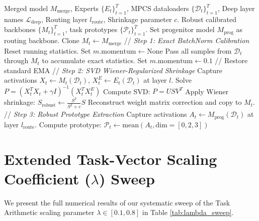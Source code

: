 \documentclass{article}
\theoremstyle{plain}
\theoremstyle{definition}
\theoremstyle{remark}
\begin{document}
\begin{algorithm}[H]
\caption{Robust Empirical Calibration (REC) Pipeline}
\label{alg:rec}
\begin{algorithmic}[1]
 Merged model $M_{\text{merge}}$, Experts $\{E_t\}_{t=1}^T$, MPCS dataloaders $\{\mathcal{D}_t\}_{t=1}^T$, Deep layer names $\mathcal{L}_{\text{deep}}$, Routing layer $l_{\text{route}}$, Shrinkage parameter $c$.
 Robust calibrated backbones $\{M_t\}_{t=1}^T$, task prototypes $\{\mathcal{P}_t\}_{t=1}^T$.
\STATE Set progenitor model $M_{\text{prog}}$ as routing backbone.
    \STATE Clone $M_t \leftarrow M_{\text{merge}}$
    \STATE // \textit{Step 1: Exact BatchNorm Calibration}
            \STATE Reset running statistics.
            \STATE Set $m.\text{momentum} \leftarrow \text{None}$
        \ENDIF
    \ENDFOR
    \STATE Pass all samples from $\mathcal{D}_t$ through $M_t$ to accumulate exact statistics.
            \STATE Set $m.\text{momentum} \leftarrow 0.1$ // Restore standard EMA
        \ENDIF
    \ENDFOR
    \STATE // \textit{Step 2: SVD Wiener-Regularized Shrinkage}
        \STATE Capture activations $X_t \leftarrow M_t(\mathcal{D}_t)$, $X^E_t \leftarrow E_t(\mathcal{D}_t)$ at layer $l$.
        \STATE Solve $P = (X_t^T X_t + \gamma I)^{-1} (X_t^T X^E_t)$
        \STATE Compute SVD: $P = U S V^T$
        \STATE Apply Wiener shrinkage: $S_{\text{robust}} \leftarrow \frac{S^2}{S^2 + c} S$
        \STATE Reconstruct weight matrix correction and copy to $M_t$.
    \ENDFOR
\ENDFOR
\STATE // \textit{Step 3: Robust Prototype Extraction}
    \STATE Capture activations $A_t \leftarrow M_{\text{prog}}(\mathcal{D}_t)$ at layer $l_{\text{route}}$.
    \STATE Compute prototype: $\mathcal{P}_t \leftarrow \text{mean}(A_t, \text{dim}=[0,2,3])$
\ENDFOR
\end{algorithmic}
\end{algorithm}

\clearpage
\section{Extended Task-Vector Scaling Coefficient ($\lambda$) Sweep}
\label{sec:lambda_appendix}
We present the full numerical results of our systematic sweep of the Task Arithmetic scaling parameter $\lambda \in [0.1, 0.8]$ in Table \ref{tab:lambda_sweep}.
\end{document}
